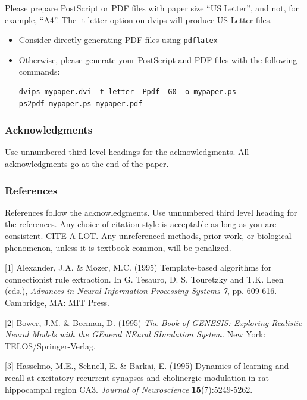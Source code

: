\documentclass{article} %
\begin{document}
Please prepare PostScript or PDF files with paper size ``US Letter'', and
not, for example, ``A4''. The -t
letter option on dvips will produce US Letter files.

\begin{itemize}

\item Consider directly generating PDF files using \verb+pdflatex+

\item Otherwise, please generate your PostScript and PDF files with the following commands:
\begin{verbatim}
dvips mypaper.dvi -t letter -Ppdf -G0 -o mypaper.ps
ps2pdf mypaper.ps mypaper.pdf
\end{verbatim}
\end{itemize}


\subsubsection*{Acknowledgments}

Use unnumbered third level headings for the acknowledgments. All
acknowledgments go at the end of the paper.

\subsubsection*{References}

References follow the acknowledgments. Use unnumbered third level heading for
the references. Any choice of citation style is acceptable as long as you are
consistent. CITE A LOT. Any unreferenced methods, prior work, or biological phenomenon, unless it is textbook-common, will be penalized.

\small{
[1] Alexander, J.A. \& Mozer, M.C. (1995) Template-based algorithms
for connectionist rule extraction. In G. Tesauro, D. S. Touretzky
and T.K. Leen (eds.), {\it Advances in Neural Information Processing
Systems 7}, pp. 609-616. Cambridge, MA: MIT Press.

[2] Bower, J.M. \& Beeman, D. (1995) {\it The Book of GENESIS: Exploring
Realistic Neural Models with the GEneral NEural SImulation System.}
New York: TELOS/Springer-Verlag.

[3] Hasselmo, M.E., Schnell, E. \& Barkai, E. (1995) Dynamics of learning
and recall at excitatory recurrent synapses and cholinergic modulation
in rat hippocampal region CA3. {\it Journal of Neuroscience}
{\bf 15}(7):5249-5262.
}
\end{document}
